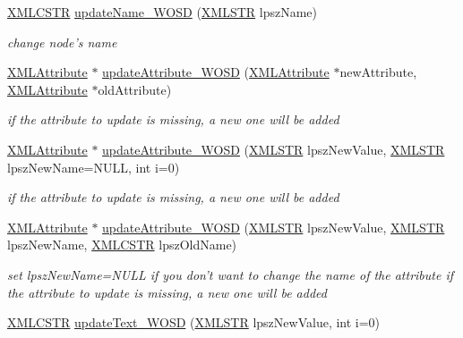 \begin{DoxyCompactItemize}
\hyperlink{xmlParser_8h_acdb0d6fd8dd596384b438d86cfb2b182}{X\-M\-L\-C\-S\-T\-R} \hyperlink{group__xmlWOSD_ga5f35571651c6b629f5c8e5d02942a1c7}{update\-Name\-\_\-\-W\-O\-S\-D} (\hyperlink{xmlParser_8h_a849d96105aa0c8f64b5c10d9151a3cdc}{X\-M\-L\-S\-T\-R} lpsz\-Name)
\begin{DoxyCompactList}\small\item\em change node's name \end{DoxyCompactList}\item 
\hyperlink{structXMLAttribute}{X\-M\-L\-Attribute} $\ast$ \hyperlink{group__xmlWOSD_gaeb6533f46c1dd1843e33653612483a0c}{update\-Attribute\-\_\-\-W\-O\-S\-D} (\hyperlink{structXMLAttribute}{X\-M\-L\-Attribute} $\ast$new\-Attribute, \hyperlink{structXMLAttribute}{X\-M\-L\-Attribute} $\ast$old\-Attribute)
\begin{DoxyCompactList}\small\item\em if the attribute to update is missing, a new one will be added \end{DoxyCompactList}\item 
\hyperlink{structXMLAttribute}{X\-M\-L\-Attribute} $\ast$ \hyperlink{group__xmlWOSD_ga695e7ac29591363833575782243eff1b}{update\-Attribute\-\_\-\-W\-O\-S\-D} (\hyperlink{xmlParser_8h_a849d96105aa0c8f64b5c10d9151a3cdc}{X\-M\-L\-S\-T\-R} lpsz\-New\-Value, \hyperlink{xmlParser_8h_a849d96105aa0c8f64b5c10d9151a3cdc}{X\-M\-L\-S\-T\-R} lpsz\-New\-Name=N\-U\-L\-L, int i=0)
\begin{DoxyCompactList}\small\item\em if the attribute to update is missing, a new one will be added \end{DoxyCompactList}\item 
\hyperlink{structXMLAttribute}{X\-M\-L\-Attribute} $\ast$ \hyperlink{group__xmlWOSD_gababf6cef26796c45b88eb5772a9cafc4}{update\-Attribute\-\_\-\-W\-O\-S\-D} (\hyperlink{xmlParser_8h_a849d96105aa0c8f64b5c10d9151a3cdc}{X\-M\-L\-S\-T\-R} lpsz\-New\-Value, \hyperlink{xmlParser_8h_a849d96105aa0c8f64b5c10d9151a3cdc}{X\-M\-L\-S\-T\-R} lpsz\-New\-Name, \hyperlink{xmlParser_8h_acdb0d6fd8dd596384b438d86cfb2b182}{X\-M\-L\-C\-S\-T\-R} lpsz\-Old\-Name)
\begin{DoxyCompactList}\small\item\em set lpsz\-New\-Name=N\-U\-L\-L if you don't want to change the name of the attribute if the attribute to update is missing, a new one will be added \end{DoxyCompactList}\item 
\hyperlink{xmlParser_8h_acdb0d6fd8dd596384b438d86cfb2b182}{X\-M\-L\-C\-S\-T\-R} \hyperlink{group__xmlWOSD_ga8809eddad474e8bd7ad5f57aea7c77ac}{update\-Text\-\_\-\-W\-O\-S\-D} (\hyperlink{xmlParser_8h_a849d96105aa0c8f64b5c10d9151a3cdc}{X\-M\-L\-S\-T\-R} lpsz\-New\-Value, int i=0)

\end{DoxyCompactItemize}
